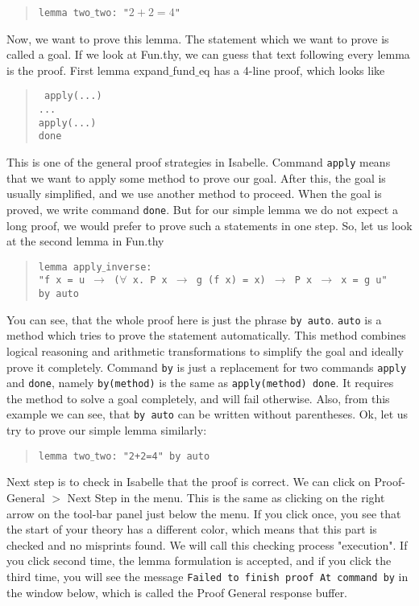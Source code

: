 \documentclass[11pt]{article}
\newcommand{\prog}[1]{\par\noindent\begin{quote}#1\end{quote}\par\noindent}
\begin{document}
\prog{\tt lemma two$\_$two: "$2+2=4$"}%
Now, we want to prove this lemma. The statement which we want to prove is called a goal. If we look at Fun.thy, we can guess that text following every lemma is the proof. First lemma expand$\_$fund$\_$eq has a 4-line proof, which looks like
\prog{\tt
    apply(...) \\
    ...\\
    apply(...) \\
    done}%
This is one of the general proof strategies in Isabelle. Command {\tt apply} means that we want to apply some method to prove our goal. After this, the goal is usually simplified, and we use another method to proceed. When the goal is proved, we write command {\tt done}. But for our simple lemma we do not expect a long proof, we would prefer to prove such a statements in one step. So, let us look at the second lemma in Fun.thy

\prog{\tt lemma apply$\_$inverse: \\
    "f x = u $\rightarrow$ ($\forall$ x. P x $\rightarrow$ g (f x) = x) $\rightarrow$ P x $\rightarrow$ x = g u" \\
    by auto}%
%  

You can see, that the whole proof here is just the phrase {\tt by auto}. {\tt auto} is a method which tries to prove the statement automatically. This method combines logical reasoning and arithmetic transformations to simplify the goal and ideally prove it completely. Command {\tt by} is just a replacement for two commands {\tt apply} and {\tt done}, namely {\tt by(method)} is the same as {\tt apply(method) done}. It requires the method to solve a goal completely, and will fail otherwise. Also, from this example we can see, that {\tt by auto} can be written without parentheses. Ok, let us try to prove our simple lemma similarly:

\prog{\tt lemma two$\_$two: "2+2=4" by auto}%

Next step is to check in Isabelle that the proof is correct. We can click on Proof-General $>$ Next Step in the menu. This is the same as clicking on the right arrow on the tool-bar panel just below the menu. If you click once, you see that the start of your theory has a different color, which means that this part is checked and no misprints found. We will call this checking process "execution". If you click second time, the lemma formulation is accepted, and if you click the third time, you will see the message {\tt Failed to finish proof At command by} in the window below, which is called the Proof General response buffer.
\end{document}
